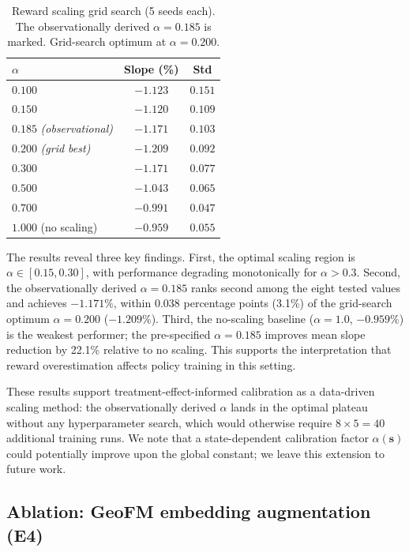 \documentclass[11pt]{article}
\begin{document}
\begin{table}[htbp]
\centering
\caption{Reward scaling grid search (5 seeds each). The observationally derived $\alpha = 0.185$ is marked. Grid-search optimum at $\alpha = 0.200$.}
\label{tab:grid}
\begin{tabular}{lcc}
\toprule
$\alpha$ & Slope (\%) & Std \\
\midrule
$0.100$                          & $-1.123$ & $0.151$ \\
$0.150$                          & $-1.120$ & $0.109$ \\
$0.185$ \textit{(observational)} & $-1.171$ & $0.103$ \\
$\mathbf{0.200}$ \textit{(grid best)} & $\mathbf{-1.209}$ & $\mathbf{0.092}$ \\
$0.300$                          & $-1.171$ & $0.077$ \\
$0.500$                          & $-1.043$ & $0.065$ \\
$0.700$                          & $-0.991$ & $0.047$ \\
$1.000$ (no scaling)             & $-0.959$ & $0.055$ \\
\bottomrule
\end{tabular}
\end{table}

The results reveal three key findings. First, the optimal scaling region is $\alpha \in [0.15, 0.30]$, with performance degrading monotonically for $\alpha > 0.3$. Second, the observationally derived $\alpha = 0.185$ ranks second among the eight tested values and achieves $-1.171\%$, within 0.038 percentage points (3.1\%) of the grid-search optimum $\alpha = 0.200$ ($-1.209\%$). Third, the no-scaling baseline ($\alpha = 1.0$, $-0.959\%$) is the weakest performer; the pre-specified $\alpha=0.185$ improves mean slope reduction by 22.1\% relative to no scaling. This supports the interpretation that reward overestimation affects policy training in this setting.

These results support treatment-effect-informed calibration as a data-driven scaling method: the observationally derived $\alpha$ lands in the optimal plateau without any hyperparameter search, which would otherwise require $8 \times 5 = 40$ additional training runs. We note that a state-dependent calibration factor $\alpha(\mathbf{s})$ could potentially improve upon the global constant; we leave this extension to future work.

\subsection{Ablation: GeoFM embedding augmentation (E4)}
\end{document}
